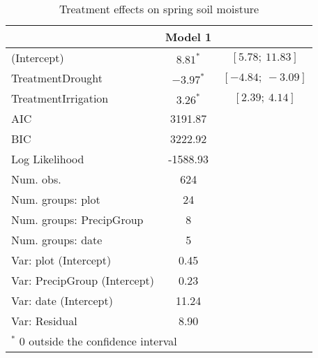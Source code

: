 \documentclass[11pt]{article}
\begin{document}
\begin{table}[h]
	\caption{Treatment effects on spring soil moisture}
	\centering
	\begin{tabular}{l c c }
		\hline
		& Model 1 \\
		\hline
		(Intercept)                  & $8.81^{*}$    	& $[5.78;\ 11.83]$  \\
		TreatmentDrought             & $-3.97^{*}$      & $[-4.84;\ -3.09]$ \\
		TreatmentIrrigation          & $3.26^{*}$       & $[2.39;\ 4.14]$   \\
		\hline
		AIC                          & 3191.87           \\
		BIC                          & 3222.92           \\
		Log Likelihood               & -1588.93          \\
		Num. obs.                    & 624               \\
		Num. groups: plot            & 24                \\
		Num. groups: PrecipGroup     & 8                 \\
		Num. groups: date            & 5                 \\
		Var: plot (Intercept)        & 0.45              \\
		Var: PrecipGroup (Intercept) & 0.23              \\
		Var: date (Intercept)        & 11.24             \\
		Var: Residual                & 8.90              \\
		\hline
		\multicolumn{2}{l}{\scriptsize{$^*$ 0 outside the confidence interval}}
	\end{tabular}
	\label{table:spotVWC}
\end{table}
\end{document}
